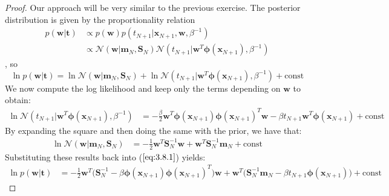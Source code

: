 \vspace{1em}

\begin{proof}
    Our approach will be very similar to the previous exercise. The
    posterior distribution is given by the proportionality relation
    \begin{align*}
        p(\mathbf{w} | \mathbf{t}) 
        &\propto p(\mathbf{w}) p(t_{N + 1} | \mathbf{x}_{N + 1}, \mathbf{w}, \beta^{-1}) \\
        &\propto \mathcal{N}(\mathbf{w} | \mathbf{m}_N, \mathbf{S}_N) 
            \mathcal{N}(t_{N + 1} | \mathbf{w}^T\bm{\phi}(\mathbf{x}_{N + 1}), \beta^{-1})
    \end{align*}
    , so
    \begin{equation*}
        \ln p(\mathbf{w} | \mathbf{t})
        = \ln \mathcal{N}(\mathbf{w} | \mathbf{m}_N, \mathbf{S}_N)
        + \ln \mathcal{N}(t_{N + 1} | \mathbf{w}^T\bm{\phi}(\mathbf{x}_{N + 1}), \beta^{-1})
        + \text{const}
        \tag{3.8.1}\label{eq:3.8.1}
    \end{equation*}
    We now compute the log likelihood and keep only the terms depending on
    $\mathbf{w}$ to obtain:
    \begin{align*}
        \ln \mathcal{N}(t_{N + 1} | \mathbf{w}^T\bm{\phi}(\mathbf{x}_{N + 1}), \beta^{-1})
        &= - \frac{\beta}{2} \mathbf{w}^T \bm{\phi}(\mathbf{x}_{N + 1})\bm{\phi}(\mathbf{x}_{N + 1})^T             \mathbf{w}
            -\beta t_{N + 1} \mathbf{w}^T \bm{\phi}(\mathbf{x}_{N + 1})
            + \text{const}
    \end{align*}
    By expanding the square and then doing the same with the prior, we have that:
    \begin{align*}
        \ln \mathcal{N}(\mathbf{w} | \mathbf{m}_N, \mathbf{S}_{N})
        &= -\frac{1}{2} \mathbf{w}^T \mathbf{S}_N^{-1} \mathbf{w}
            + \mathbf{w}^T \mathbf{S}_N^{-1} \mathbf{m}_N 
            + \text{const}
    \end{align*}
    Substituting these results back into ($\ref{eq:3.8.1}$) yields:
    \begin{align*}
        \ln p(\mathbf{w} | \mathbf{t}) 
        &= -\frac{1}{2} \mathbf{w}^T
                \big(\mathbf{S}_N^{-1} - \beta \bm{\phi}(\mathbf{x}_{N + 1})\bm{\phi}
                (\mathbf{x}_{N + 1})^T\big) \mathbf{w}
            + \mathbf{w}^T \big(\mathbf{S}_N^{-1} \mathbf{m}_N 
                - \beta t_{N + 1} \bm{\phi}(\mathbf{x}_{N + 1})\big)
            + \text{const}
    \end{align*}

\end{proof}
